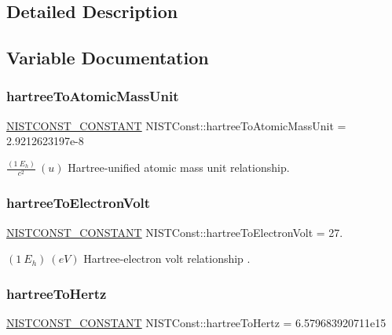\subsection{Detailed Description}


\subsection{Variable Documentation}
\mbox{\label{group___n_i_s_t_const-_hartree_gadd551bb415cf6590fe86cbab53282790}} 
\subsubsection{\texorpdfstring{hartree\+To\+Atomic\+Mass\+Unit}{hartreeToAtomicMassUnit}}
{\footnotesize\ttfamily \mbox{\hyperlink{_n_i_s_t_const_8hpp_a2b0fc1d7452373f816175dd86ce26729}{N\+I\+S\+T\+C\+O\+N\+S\+T\+\_\+\+C\+O\+N\+S\+T\+A\+NT}} N\+I\+S\+T\+Const\+::hartree\+To\+Atomic\+Mass\+Unit = 2.\+9212623197e-\/8}

$\frac{(1\ E_h)}{c^2} \ (u)$ Hartree-\/unified atomic mass unit relationship. \mbox{\label{group___n_i_s_t_const-_hartree_gaba497bbf24c554950d652cdfa84b102c}} 
\subsubsection{\texorpdfstring{hartree\+To\+Electron\+Volt}{hartreeToElectronVolt}}
{\footnotesize\ttfamily \mbox{\hyperlink{_n_i_s_t_const_8hpp_a2b0fc1d7452373f816175dd86ce26729}{N\+I\+S\+T\+C\+O\+N\+S\+T\+\_\+\+C\+O\+N\+S\+T\+A\+NT}} N\+I\+S\+T\+Const\+::hartree\+To\+Electron\+Volt = 27.}

$(1\ E_h) \ (eV)$ Hartree-\/electron volt relationship . \mbox{\label{group___n_i_s_t_const-_hartree_gabf95934e6d5fe9b153d31d35a67a190c}} 
\subsubsection{\texorpdfstring{hartree\+To\+Hertz}{hartreeToHertz}}
{\footnotesize\ttfamily \mbox{\hyperlink{_n_i_s_t_const_8hpp_a2b0fc1d7452373f816175dd86ce26729}{N\+I\+S\+T\+C\+O\+N\+S\+T\+\_\+\+C\+O\+N\+S\+T\+A\+NT}} N\+I\+S\+T\+Const\+::hartree\+To\+Hertz = 6.\+579683920711e15}

